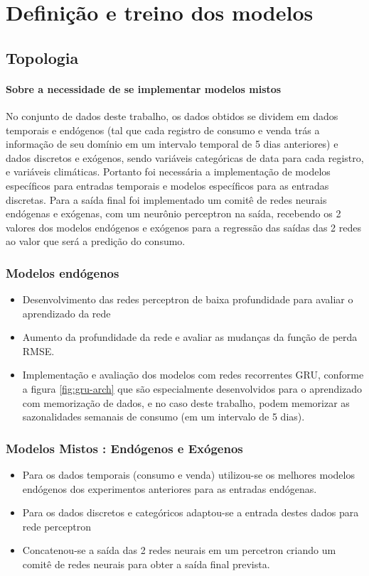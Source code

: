     \section{Definição e treino dos modelos}
        \subsection{Topologia}
            \paragraph*{Sobre a necessidade de se implementar modelos mistos}
                No conjunto de dados deste trabalho, os dados obtidos se dividem em dados temporais e endógenos (tal que cada registro de consumo e venda trás a informação de seu domínio em um intervalo temporal de 5 dias anteriores) e dados discretos e exógenos, sendo variáveis categóricas de data para cada registro, e variáveis climáticas.
                Portanto foi necessária a implementação de modelos específicos para entradas temporais e modelos específicos para as entradas discretas.
                Para a saída final foi implementado um comitê de redes neurais endógenas e exógenas, com um neurônio perceptron na saída, recebendo os 2 valores dos modelos endógenos e exógenos para a regressão das saídas das 2 redes ao valor que será a predição do consumo.
         	\subsubsection{Modelos endógenos}
         	\begin{itemize}
                \item	Desenvolvimento das redes perceptron de baixa profundidade para avaliar o aprendizado da rede
                \item	Aumento da profundidade da rede e avaliar as mudanças da função de perda RMSE. 
                \item	Implementação e avaliação dos modelos com redes recorrentes GRU, conforme a figura \ref{fig:gru-arch} que são especialmente desenvolvidos para o aprendizado com memorização de dados, e no caso deste trabalho, podem memorizar as sazonalidades semanais de consumo (em um intervalo de 5 dias).
            \end{itemize}
            \subsubsection{Modelos Mistos : Endógenos e Exógenos}
                \begin{itemize}
                    \item Para os dados temporais (consumo e venda) utilizou-se os melhores modelos endógenos dos experimentos anteriores para as entradas endógenas. 
                    \item Para os dados discretos e categóricos adaptou-se a entrada destes dados para rede perceptron
                    \item  Concatenou-se a saída das 2 redes neurais em um percetron criando um comitê de redes neurais para obter a saída final prevista.
                \end{itemize}
            
